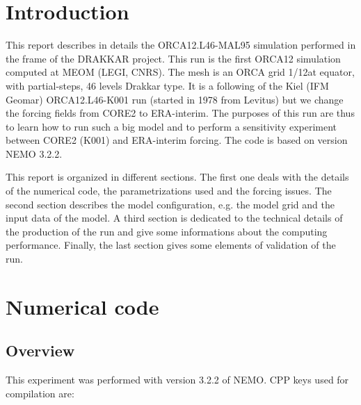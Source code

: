 \documentclass[12pt]{article}
\begin{document}
\maketitle

\section*{Introduction}

This report describes in details the ORCA12.L46-MAL95 simulation performed in the frame of the DRAKKAR project. This run is the first ORCA12 simulation computed at MEOM (LEGI, CNRS). The mesh is an ORCA grid 1/12\degres \enspace at equator, with partial-steps, 46 levels Drakkar type. It is a following of the Kiel (IFM Geomar) ORCA12.L46-K001 run (started in 1978 from Levitus) but we change the forcing fields from CORE2 to ERA-interim. The purposes of this run are thus to learn how to run such a big model and to perform a sensitivity experiment between CORE2 (K001) and ERA-interim forcing. The code is based on version NEMO 3.2.2.

This report is organized in different sections. The first one deals with the details of the numerical code, the parametrizations used and the forcing issues. The second section describes the model configuration, e.g. the model grid and the input data of the model. A third section is dedicated to the technical details of the production of the run and give some informations about the computing performance. Finally, the last section gives some elements of validation of the run.


\section{Numerical code}


\subsection{Overview}

This experiment was performed with version 3.2.2 of NEMO. CPP keys used for compilation are:
\end{document}
